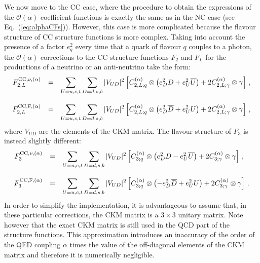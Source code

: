We now move to the CC case, where the procedure to obtain the
expressions of the $\mathcal{O}(\alpha)$ coefficient functions is
exactly the same as in the NC case (see
Eq.~(\ref{eq:alphaCFs})). However, this case is more complicated
because the flavour structure of CC structure functions is more
complex.
%
Taking into account the presence of a factor $e_q^2$ every time that a
quark of flavour $q$ couples to a photon, the $\mathcal{O}(\alpha)$
corrections to the CC structure functions $F_2$ and $F_L$ for the
productions of a neutrino or an anti-neutrino take the form:
\begin{equation}\label{compactNu}
\begin{array}{rcl}
F_{2,L}^{{\rm CC},\nu,(\alpha)} &=& \displaystyle
                              \sum_{U=u,c,t}\sum_{D=d,s,b}|V_{UD}|^2\left[C_{2,L;q}^{(\alpha)}\otimes\left(e_D^2D +e_U^2\overline{U}\right) +2 C_{2,L;\gamma}^{(\alpha)}\otimes\gamma\right]\,,\\
\\
F_{2,L}^{{\rm CC},\overline{\nu},(\alpha)} &=& \displaystyle
\sum_{U=u,c,t}\sum_{D=d,s,b}|V_{UD}|^2\left[C_{2,L;q}^{(\alpha)}\otimes\left(e_D^2\overline{D}
    +e_U^2U\right) +2 C_{2,L;\gamma}^{(\alpha)}\otimes\gamma\right]\,,
\end{array}
\end{equation}
where $V_{UD}$ are the elements of the CKM matrix.
%
The flavour structure of $F_3$ is instead slightly different:
\begin{equation}\label{compactNuF3}
\begin{array}{rcl}
F_3^{{\rm CC},\nu,(\alpha)} &=& \displaystyle
                              \sum_{U=u,c,t}\sum_{D=d,s,b}|V_{UD}|^2\left[C_{3;q}^{(\alpha)}\otimes\left(e_D^2D -e_U^2\overline{U}\right) +2 C_{3;\gamma}^{(\alpha)}\otimes\gamma\right]\,,\\
\\
F_3^{{\rm CC},\overline{\nu},(\alpha)} &=& \displaystyle
\sum_{U=u,c,t}\sum_{D=d,s,b}|V_{UD}|^2\left[C_{3;q}^{(\alpha)}\otimes\left(-e_D^2\overline{D}
    +e_U^2U\right) +2 C_{3;\gamma}^{(\alpha)}\otimes\gamma\right]\,.
\end{array}
\end{equation}
In order to simplify the implementation, it is advantageous to assume
that, in these particular corrections, the CKM matrix is a $3 \times 3$
unitary matrix. Note however that the exact CKM matrix is still used
in the QCD part of the structure functions.
%
This approximation introduces an inaccuracy of the order of the QED
coupling $\alpha$ times the value of the off-diagonal elements of the
CKM matrix and therefore it is numerically negligible.

